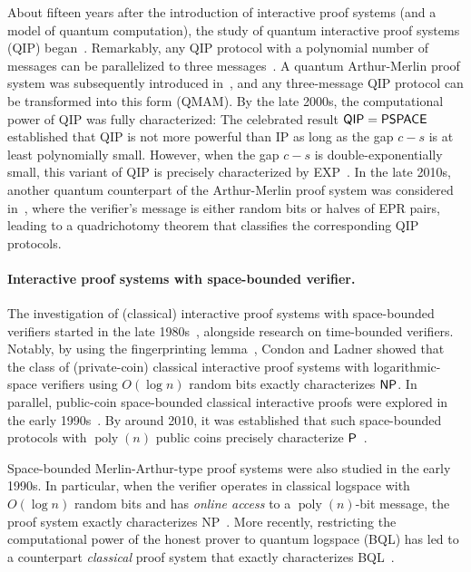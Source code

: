 \documentclass[10pt,a4paper]{article}
\numberwithin{equation}{section}
\numberwithin{figure}{section}
\newcommand{\Ptime}{\textnormal{\textsf{P}}\xspace}
\newcommand{\EXP}{\textnormal{\textsf{EXP}}\xspace}
\newcommand{\NP}{\textnormal{\textsf{NP}}\xspace}
\newcommand{\IP}{\textnormal{\textsf{IP}}\xspace}
\newcommand{\QIP}{\textnormal{\textsf{QIP}}\xspace}
\newcommand{\QMAM}{\textnormal{\textsf{QMAM}}\xspace}
\newcommand{\PSPACE}{\textnormal{\textsf{PSPACE}}\xspace}
\newcommand{\BQL}{\textnormal{\textsf{BQL}}\xspace}
\DeclareMathOperator\poly{poly}
\begin{document}
About fifteen years after the introduction of interactive proof systems (and a model of quantum computation), the study of quantum interactive proof systems (\QIP{}) began~\cite{Wat99QIP}. Remarkably, any \QIP{} protocol with a polynomial number of messages can be parallelized to three messages~\cite{KW00}. 
A quantum Arthur-Merlin proof system was subsequently introduced in~\cite{MW05}, and any three-message \QIP{} protocol can be transformed into this form (\QMAM{}).
By the late 2000s, the computational power of \QIP{} was fully characterized: The celebrated result $\QIP{}=\PSPACE{}$~\cite{JJUW11} established that \QIP{} is not more powerful than \IP{} as long as the gap $c-s$ is at least polynomially small. 
However, when the gap $c-s$ is double-exponentially small, this variant of \QIP{} is precisely characterized by \EXP{}~\cite{IKW12}. 
In the late 2010s, another quantum counterpart of the Arthur-Merlin proof system was considered in~\cite{KLGN19}, where the verifier's message is either random bits or halves of EPR pairs, leading to a quadrichotomy theorem that classifies the corresponding \QIP{} protocols. 

\paragraph{Interactive proof systems with space-bounded verifier.}
The investigation of (classical) interactive proof systems with space-bounded verifiers started in the late 1980s~\cite{DS89,Condon91}, alongside research on time-bounded verifiers. 
Notably, by using the fingerprinting lemma~\cite{Lipton90}, Condon and Ladner \cite{CL95} showed that the class of (private-coin) classical interactive proof systems with logarithmic-space verifiers using $O(\log{n})$ random bits exactly characterizes $\NP$. 
In parallel, public-coin space-bounded classical interactive proofs were explored in the early 1990s~\cite{Fortnow89,FL93,Condon92survey}. By around 2010, it was established that such space-bounded protocols with $\poly(n)$ public coins precisely characterize $\Ptime$~\cite{GKR15}. 

Space-bounded Merlin-Arthur-type proof systems were also studied in the early 1990s. In particular, when the verifier operates in classical logspace with $O(\log n)$ random bits and has \textit{online access} to a $\poly(n)$-bit message, the proof system exactly characterizes \NP{}~\cite{Lipton90}. 
More recently, restricting the computational power of the honest prover to quantum logspace (\BQL{}) has led to a counterpart \textit{classical} proof system that exactly characterizes \BQL{}~\cite{GRZ23}.
\end{document}
